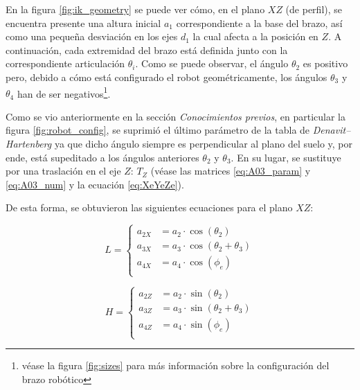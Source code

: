 \documentclass[a4paper,12pt]{article}
\begin{document}
En la figura \ref{fig:ik_geometry} se puede ver cómo, en el plano $XZ$ (de perfil),
se encuentra presente una altura inicial $a_1$ correspondiente a la base del brazo,
así como una pequeña desviación en los ejes $d_1$ la cual afecta a la posición en $Z$.
A continuación, cada extremidad del brazo está definida junto con la correspondiente
articulación $\theta_i$. Como se puede observar, el ángulo $\theta_2$ es positivo pero,
debido a cómo está configurado el robot geométricamente, los ángulos $\theta_3$ y
$\theta_4$ han de ser negativos\footnote{véase la figura \ref{fig:sizes} para más
    información sobre la configuración del brazo robótico}.

Como se vio anteriormente en la sección \textit{Conocimientos previos},
en particular la figura \ref{fig:robot_config}, se suprimió el último parámetro de la
tabla de \textit{Denavit–Hartenberg} ya que dicho ángulo siempre es perpendicular al
plano del suelo y, por ende, está supeditado a los ángulos anteriores $\theta_2$ y
$\theta_3$. En su lugar, se sustituye por una traslación en el eje $Z$: $T_Z$ (véase
las matrices \ref{eq:A03_param} y \ref{eq:A03_num} y la ecuación \ref{eq:XeYeZe}).

De esta forma, se obtuvieron las siguientes ecuaciones para el plano $XZ$:

\begin{table}[H]
    \parbox{.45\linewidth}{
        \begin{equation} \label{eq:x_equations}
            L = \left\{\begin{aligned}
                a_{2X} & = a_2 \cdot \cos(\theta_2)            \\
                a_{3X} & = a_3 \cdot \cos(\theta_2 + \theta_3) \\
                a_{4X} & = a_4 \cdot \cos(\phi_e)              \\
            \end{aligned}
            \right.
        \end{equation}
    }
    \hfill
    \parbox{.45\linewidth}{
        \begin{equation} \label{eq:z_equations}
            H = \left\{\begin{aligned}
                a_{2Z} & = a_2 \cdot \sin(\theta_2)            \\
                a_{3Z} & = a_3 \cdot \sin(\theta_2 + \theta_3) \\
                a_{4Z} & = a_4 \cdot \sin(\phi_e)              \\
            \end{aligned}
            \right.
        \end{equation}
    }
\end{table}
\end{document}
